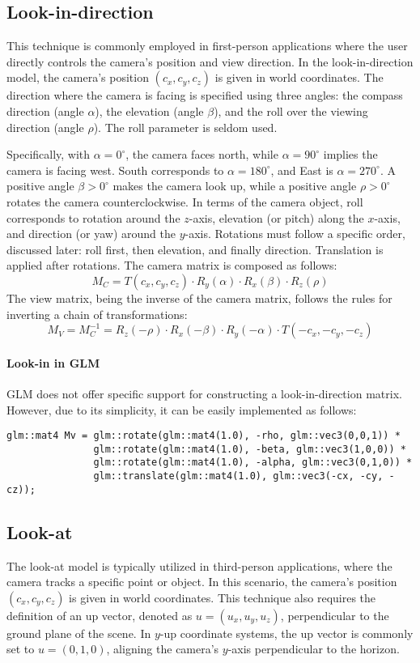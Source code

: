 \subsection{Look-in-direction}
This technique is commonly employed in first-person applications where the user directly controls the camera's position and view direction. 
In the look-in-direction model, the camera's position $(c_x, c_y, c_z)$ is given in world coordinates. 
The direction where the camera is facing is specified using three angles: the compass direction (angle $\alpha$), the elevation (angle $\beta$), and the roll over the viewing direction (angle $\rho$). 
The roll parameter is seldom used.

Specifically, with $\alpha=0^\circ$, the camera faces north, while $\alpha=90^\circ$ implies the camera is facing west. 
South corresponds to $\alpha=180^\circ$, and East is $\alpha=270^\circ$. 
A positive angle $\beta > 0^\circ$ makes the camera look up, while a positive angle $\rho > 0^\circ$ rotates the camera counterclockwise. 
In terms of the camera object, roll corresponds to rotation around the $z$-axis, elevation (or pitch) along the $x$-axis, and direction (or yaw) around the $y$-axis. 
Rotations must follow a specific order, discussed later: roll first, then elevation, and finally direction. 
Translation is applied after rotations. 
The camera matrix is composed as follows:
\[M_C=T(c_x, c_y, c_z) \cdot R_y(\alpha) \cdot R_x(\beta) \cdot R_z(\rho)\]
The view matrix, being the inverse of the camera matrix, follows the rules for inverting a chain of transformations:
\[M_V=M_C^{-1}=R_z(-\rho) \cdot R_x(-\beta) \cdot R_y(-\alpha) \cdot T(-c_x, -c_y, -c_z)\]

\paragraph*{Look-in in GLM}
GLM does not offer specific support for constructing a look-in-direction matrix. 
However, due to its simplicity, it can be easily implemented as follows:
\begin{verbatim}
glm::mat4 Mv = glm::rotate(glm::mat4(1.0), -rho, glm::vec3(0,0,1)) *
               glm::rotate(glm::mat4(1.0), -beta, glm::vec3(1,0,0)) *
               glm::rotate(glm::mat4(1.0), -alpha, glm::vec3(0,1,0)) *
               glm::translate(glm::mat4(1.0), glm::vec3(-cx, -cy, -cz));
\end{verbatim}

\subsection{Look-at}
The look-at model is typically utilized in third-person applications, where the camera tracks a specific point or object. 
In this scenario, the camera's position $(c_x, c_y, c_z)$ is given in world coordinates. 
This technique also requires the definition of an up vector, denoted as $u=(u_x, u_y, u_z)$, perpendicular to the ground plane of the scene. 
In $y$-up coordinate systems, the up vector is commonly set to $u=(0, 1, 0)$, aligning the camera's $y$-axis perpendicular to the horizon.

